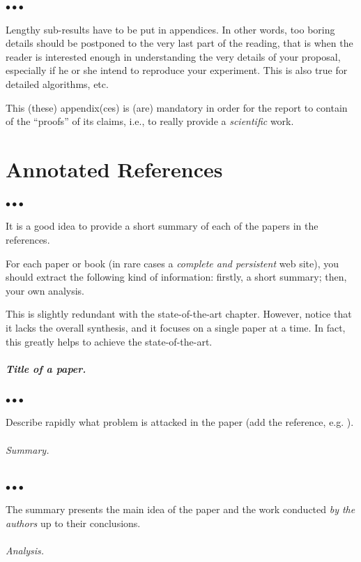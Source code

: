 \documentclass[11pt, english, screen, research-development]{report-rd-info}
\newenvironment{explanation}
{\color{blue}
 \begin{list}{}{\hspace{0.2\textwidth}\color{blue}}\item $\bullet\bullet\bullet$
}
{\end{list}}
\begin{document}
\begin{explanation}
   Lengthy sub-results have to be put in appendices.
    In other words, too boring details should be postponed to the very last part of the reading, that is when the reader is interested enough in understanding the very details of your proposal, especially if he or she intend to reproduce your experiment.
    This is also true for detailed algorithms, etc.

   This (these) appendix(ces) is (are) mandatory in order for the report to contain of the ``proofs'' of its claims, i.e., to really provide a \emph{scientific} work.
\end{explanation}

\chapter{Annotated References}
\label{app:FichesLecture}

\begin{explanation}
   It is a good idea to provide a short summary of each of the papers in the references.

   For each paper or book (in rare cases a \emph{complete and persistent} web site), you should extract the following kind of information:  firstly, a short summary;  then, your own analysis.

   This is slightly redundant with the state-of-the-art chapter.
   However, notice that it lacks the overall synthesis, and it focuses on a single paper at a time.
    In fact, this greatly helps to achieve the state-of-the-art.
\end{explanation}

\paragraph{\emph{Title of a paper}.}

\begin{explanation}
   Describe rapidly what problem is attacked in the paper (add the reference, e.g. \cite{Pascal-1671}).
\end{explanation}

\subparagraph{Summary.}

\begin{explanation}
   The summary presents the main idea of the paper and the work conducted \emph{by the authors} up to their conclusions.
\end{explanation}

\subparagraph{Analysis.}
\end{document}
